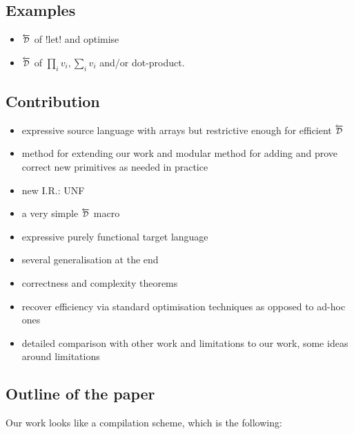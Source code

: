 \subsection{Examples}

\begin{itemize}
    \item $\Dsynrevsymbol$ of !let! and optimise
    \item $\Dsynrevsymbol$ of $\prod_i v_i, \sum_i v_i$ and/or dot-product.
\end{itemize}

\subsection{Contribution}

\begin{itemize}
    \item expressive source language with arrays but restrictive enough for efficient $\Dsynrevsymbol$
    \item method for extending our work and modular method for adding and prove correct new primitives as needed in practice 
    \item new I.R.: UNF
    \item a very simple $\Dsynrevsymbol$ macro
    \item expressive purely functional target language
    \item several generalisation at the end
    \item correctness and complexity theorems
    \item recover efficiency via standard optimisation techniques as opposed to ad-hoc ones
    \item detailed comparison with other work and limitations to our work, some ideas around limitations
\end{itemize}

\subsection{Outline of the paper}

Our work looks like a compilation scheme, which is the following:

